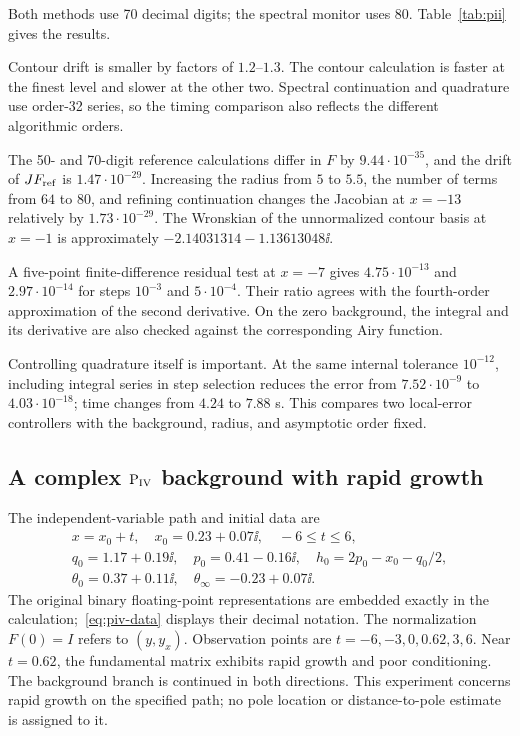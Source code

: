 Both methods use 70 decimal digits; the spectral monitor uses 80.
Table~\ref{tab:pii} gives the results.
\begin{table}[htbp]\centering\small
\caption{Regular $\PII$ background. Indicators are defined in
\eqref{eq:errors} and~\eqref{eq:global-drift}.}\label{tab:pii}

\end{table}
Contour drift is smaller by factors of $1.2$--$1.3$.
The contour calculation is faster at the finest level and slower at
the other two. Spectral continuation and quadrature use order-32 series,
so the timing comparison also reflects the different algorithmic orders.

The 50- and 70-digit reference calculations differ in $F$ by
$9.44\cdot10^{-35}$, and the drift of $JF_{\rm ref}$ is
$1.47\cdot10^{-29}$. Increasing the radius from $5$ to $5.5$, the
number of terms from $64$ to $80$, and refining continuation changes
the Jacobian at $x=-13$ relatively by $1.73\cdot10^{-29}$.
The Wronskian of the unnormalized contour basis at $x=-1$ is
approximately $-2.14031314-1.13613048\ii$.

A five-point finite-difference residual test at $x=-7$ gives
$4.75\cdot10^{-13}$ and $2.97\cdot10^{-14}$ for steps $10^{-3}$ and
$5\cdot10^{-4}$. Their ratio agrees with the fourth-order approximation
of the second derivative. On the zero background, the integral and its
derivative are also checked against the corresponding Airy function.

Controlling quadrature itself is important. At the same internal
tolerance $10^{-12}$, including integral series in step selection
reduces the error from $7.52\cdot10^{-9}$ to $4.03\cdot10^{-18}$;
time changes from $4.24$ to $7.88$ s. This compares two local-error
controllers with the background, radius, and asymptotic order fixed.

\subsection{A complex \texorpdfstring{$\mathrm{P}_{\mathrm{IV}}$}{PIV} background with rapid growth}
The independent-variable path and initial data are
\begin{equation}\label{eq:piv-data}
 \begin{gathered}
 x=x_0+t,\quad x_0=0.23+0.07\ii,\quad -6\le t\le6,\\
 q_0=1.17+0.19\ii,\quad p_0=0.41-0.16\ii,\quad
 h_0=2p_0-x_0-q_0/2,\\
 \theta_0=0.37+0.11\ii,\quad\theta_\infty=-0.23+0.07\ii.
 \end{gathered}
\end{equation}
The original binary floating-point representations are embedded exactly
in the calculation;~\eqref{eq:piv-data} displays their decimal notation.
The normalization $F(0)=I$ refers to $(y,y_x)$.
Observation points are $t=-6,-3,0,0.62,3,6$.
Near $t=0.62$, the fundamental matrix exhibits rapid growth and poor
conditioning. The background branch is continued in both directions.
This experiment concerns rapid growth on the specified path; no pole
location or distance-to-pole estimate is assigned to it.

